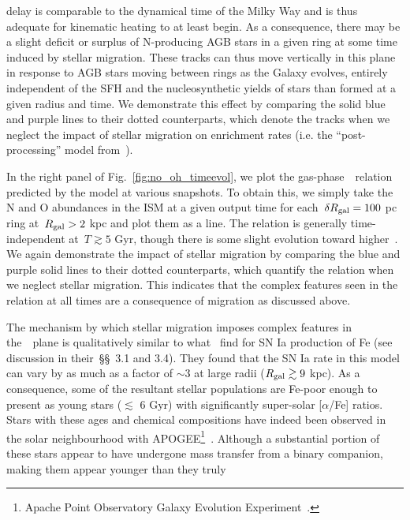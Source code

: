 \documentclass[ms.tex]{subfiles}
\begin{document}
delay is comparable to the dynamical time of the Milky Way and is thus adequate
for kinematic heating to at least begin.
As a consequence, there may be a slight deficit or surplus of N-producing AGB
stars in a given ring at some time induced by stellar migration.
These tracks can thus move vertically in this plane in response to AGB stars
moving between rings as the Galaxy evolves, entirely independent of the SFH and
the nucleosynthetic yields of stars than formed at a given radius and time.
We demonstrate this effect by comparing the solid blue and purple lines to
their dotted counterparts, which denote the tracks when we neglect the impact
of stellar migration on enrichment rates (i.e. the ``post-processing'' model
from~\citealp{Johnson2021}).
\par
In the right panel of Fig.~\ref{fig:no_oh_timeevol}, we plot the
gas-phase~\ohno~relation predicted by the model at various snapshots.
To obtain this, we simply take the N and O abundances in the ISM at a given
output time for each~$\delta R_\text{gal} = 100$ pc ring at~$R_\text{gal} > 2$ kpc and plot
them as a line.
The relation is generally time-independent at~$T \gtrsim 5$ Gyr, though there
is some slight evolution toward higher~\no.
We again demonstrate the impact of stellar migration by comparing the blue and
purple solid lines to their dotted counterparts, which quantify the relation
when we neglect stellar migration.
This indicates that the complex features seen in the relation at all times are
a consequence of migration as discussed above.
\par
The mechanism by which stellar migration imposes complex features in
the~\ohno~plane is qualitatively similar to what~\citet{Johnson2021} find for
SN Ia production of Fe (see discussion in their~\S\S~3.1 and 3.4).
They found that the SN Ia rate in this model can vary by as much as a factor of
$\sim$3 at large radii ($R_\text{gal} \gtrsim 9$ kpc).
As a consequence, some of the resultant stellar populations are Fe-poor enough
to present as young stars ($\lesssim$ 6 Gyr) with significantly super-solar
[$\alpha$/Fe] ratios.
Stars with these ages and chemical compositions have indeed been observed in
the solar neighbourhood with APOGEE\footnote{
	Apache Point Observatory Galaxy Evolution Experiment~\citep{Majewski2017}.
}~\citep{Chiappini2015, Martig2015, Martig2016, Warfield2021}.
Although a substantial portion of these stars appear to have undergone mass
transfer from a binary companion, making them appear younger than they truly
\end{document}
